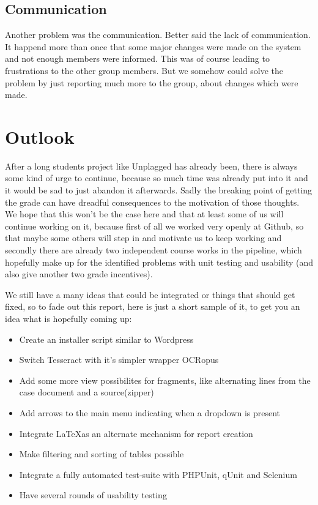 \subsection{Communication}

Another problem was the communication. Better said the lack of communication. It happend more than once that some major changes were made on the system and not enough members were informed. This was of course leading to frustrations to the other group members. But we somehow could solve the problem by just reporting much more to the group, about changes which were made.

\section{Outlook}

After a long students project like Unplagged has already been, there is always some kind of urge to continue, because so much time was already put into it and it would be sad to just abandon it afterwards. Sadly the breaking point of getting the grade can have dreadful consequences to the motivation of those thoughts. We hope that this won't be the case here and that at least some of us will continue working on it, because first of all we worked very openly at Github, so that maybe some others will step in and motivate us to keep working and secondly there are already two independent course works in the pipeline, which hopefully make up for the identified problems with unit testing and usability (and also give another two grade incentives).

We still have a many ideas that could be integrated or things that should get fixed, so to fade out this report, here is just a short sample of it, to get you an idea what is hopefully coming up:

\begin{itemize}
\item Create an installer script similar to Wordpress
\item Switch Tesseract with it's simpler wrapper OCRopus
\item Add some more view possibilites for fragments, like alternating lines from the case document and a source(zipper)
\item Add arrows to the main menu indicating when a dropdown is present
\item Integrate \LaTeX as an alternate mechanism for report creation
\item Make filtering and sorting of tables possible
\item Integrate a fully automated test-suite with PHPUnit, qUnit and Selenium
\item Have several rounds of usability testing
\end{itemize}